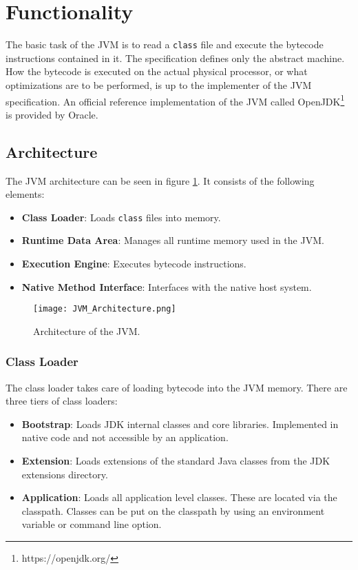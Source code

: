 \section{Functionality}

The basic task of the JVM is to read a \texttt{class} file and execute the bytecode instructions contained in it. The specification defines only the abstract machine. How the bytecode is executed on the actual physical processor, or what optimizations are to be performed, is up to the implementer of the JVM specification. An official reference implementation of the JVM called OpenJDK\footnote{https://openjdk.org/} is provided by Oracle. 

\subsection{Architecture}

The JVM architecture can be seen in figure \ref{fig:JVMArchitecture}. It consists of the following elements: 

\begin{itemize}
    \item \textbf{Class Loader}: Loads \texttt{class} files into memory.
    \item \textbf{Runtime Data Area}: Manages all runtime memory used in the JVM.
    \item \textbf{Execution Engine}: Executes bytecode instructions.
    \item \textbf{Native Method Interface}: Interfaces with the native host system. 
\end{itemize}

\begin{figure}[]
    \centering
    \texttt{[image: JVM\_Architecture.png]}
    \caption{Architecture of the JVM.}
    \label{fig:JVMArchitecture}
\end{figure}

\subsubsection{Class Loader}

The class loader takes care of loading bytecode into the JVM memory. There are three tiers of class loaders:

\begin{itemize}
    \item \textbf{Bootstrap}: Loads JDK internal classes and core libraries. Implemented in native code and not accessible by an application. 
    \item \textbf{Extension}: Loads extensions of the standard Java classes from the JDK extensions directory. 
    \item \textbf{Application}: Loads all application level classes. These are located via the classpath. Classes can be put on the classpath by using an environment variable or command line option. 
\end{itemize}


